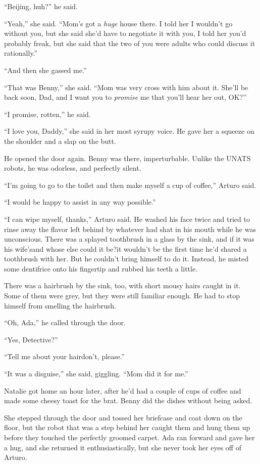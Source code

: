 “Beijing, huh?” he said.

“Yeah,” she said. “Mom’s got a \emph{huge} house there. I told her
I wouldn’t go without you, but she said she’d have to negotiate it
with you, I told her you’d probably freak, but she said that the
two of you were adults who could discuss it rationally.”

“And then she gassed me.”

“That was Benny,” she said. “Mom was very cross with him about it.
She’ll be back soon, Dad, and I want you to \emph{promise} me that
you’ll hear her out, OK?”

“I promise, rotten,” he said.

“I love you, Daddy,” she said in her most syrupy voice. He gave her
a squeeze on the shoulder and a slap on the butt.

He opened the door again. Benny was there, imperturbable. Unlike
the UNATS robots, he was odorless, and perfectly silent.

“I’m going to go to the toilet and then make myself a cup of
coffee,” Arturo said.

“I would be happy to assist in any way possible.”

“I can wipe myself, thanks,” Arturo said. He washed his face twice
and tried to rinse away the flavor left behind by whatever had shat
in his mouth while he was unconscious. There was a splayed
toothbrush in a glass by the sink, and if it was his wife’s{\dash}and
whose else could it be?{\dash}it wouldn’t be the first time he’d shared a
toothbrush with her. But he couldn’t bring himself to do it.
Instead, he misted some dentifrice onto his fingertip and rubbed
his teeth a little.

There was a hairbrush by the sink, too, with short mousy hairs
caught in it. Some of them were grey, but they were still familiar
enough. He had to stop himself from smelling the hairbrush.

“Oh, Ada,” he called through the door.

“Yes, Detective?”

“Tell me about your hair\erratum{-}{\dash}don’t, please.”

“It was a disguise,” she said, giggling. “Mom did it for me.”

\tb

Natalie got home an hour later, after he’d had a couple of cups of
coffee and made some cheesy toast for the brat. Benny did the
dishes without being asked.

She stepped through the door and tossed her briefcase and coat down
on the floor, but the robot that was a step behind her caught them
and hung them up before they touched the perfectly groomed carpet.
Ada ran forward and gave her a hug, and she returned it
enthusiastically, but she never took her eyes off of Arturo.

